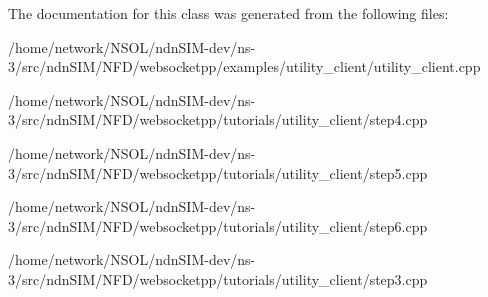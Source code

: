 The documentation for this class was generated from the following files\+:\begin{DoxyCompactItemize}
\item 
/home/network/\+N\+S\+O\+L/ndn\+S\+I\+M-\/dev/ns-\/3/src/ndn\+S\+I\+M/\+N\+F\+D/websocketpp/examples/utility\+\_\+client/utility\+\_\+client.\+cpp\item 
/home/network/\+N\+S\+O\+L/ndn\+S\+I\+M-\/dev/ns-\/3/src/ndn\+S\+I\+M/\+N\+F\+D/websocketpp/tutorials/utility\+\_\+client/step4.\+cpp\item 
/home/network/\+N\+S\+O\+L/ndn\+S\+I\+M-\/dev/ns-\/3/src/ndn\+S\+I\+M/\+N\+F\+D/websocketpp/tutorials/utility\+\_\+client/step5.\+cpp\item 
/home/network/\+N\+S\+O\+L/ndn\+S\+I\+M-\/dev/ns-\/3/src/ndn\+S\+I\+M/\+N\+F\+D/websocketpp/tutorials/utility\+\_\+client/step6.\+cpp\item 
/home/network/\+N\+S\+O\+L/ndn\+S\+I\+M-\/dev/ns-\/3/src/ndn\+S\+I\+M/\+N\+F\+D/websocketpp/tutorials/utility\+\_\+client/step3.\+cpp\end{DoxyCompactItemize}
